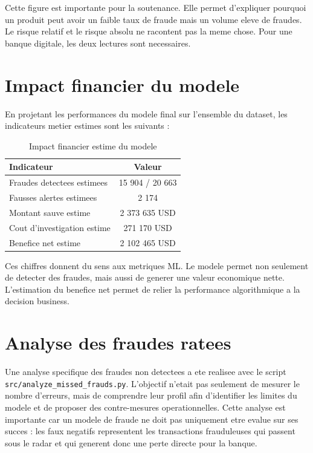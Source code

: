 ﻿\documentclass[12pt,a4paper,oneside]{report}
\begin{document}
Cette figure est importante pour la soutenance. Elle permet d'expliquer pourquoi un produit peut avoir un faible taux de fraude mais un volume eleve de fraudes. Le risque relatif et le risque absolu ne racontent pas la meme chose. Pour une banque digitale, les deux lectures sont necessaires.

\section{Impact financier du modele}

En projetant les performances du modele final sur l'ensemble du dataset, les indicateurs metier estimes sont les suivants :

\begin{table}[H]
\centering
\caption{Impact financier estime du modele}
\begin{tabular}{lc}
\toprule
\textbf{Indicateur} & \textbf{Valeur} \\
\midrule
Fraudes detectees estimees & 15 904 / 20 663 \\
Fausses alertes estimees & 2 174 \\
Montant sauve estime & 2 373 635 USD \\
Cout d'investigation estime & 271 170 USD \\
Benefice net estime & 2 102 465 USD \\
\bottomrule
\end{tabular}
\end{table}

Ces chiffres donnent du sens aux metriques ML. Le modele permet non seulement de detecter des fraudes, mais aussi de generer une valeur economique nette. L'estimation du benefice net permet de relier la performance algorithmique a la decision business.

\section{Analyse des fraudes ratees}

Une analyse specifique des fraudes non detectees a ete realisee avec le script \texttt{src/analyze\_missed\_frauds.py}. L'objectif n'etait pas seulement de mesurer le nombre d'erreurs, mais de comprendre leur profil afin d'identifier les limites du modele et de proposer des contre-mesures operationnelles. Cette analyse est importante car un modele de fraude ne doit pas uniquement etre evalue sur ses succes : les faux negatifs representent les transactions frauduleuses qui passent sous le radar et qui generent donc une perte directe pour la banque.
\end{document}
